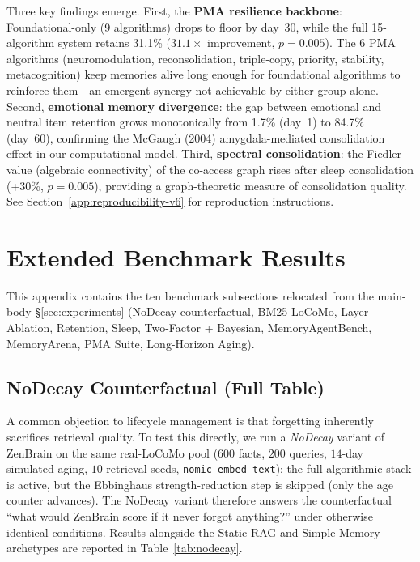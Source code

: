\documentclass{article}
\begin{document}
Three key findings emerge. First, the \textbf{PMA resilience backbone}:
Foundational-only (9 algorithms) drops to floor by day~30, while the
full 15-algorithm system retains 31.1\% ($31.1\times$ improvement,
$p = 0.005$). The 6 PMA algorithms (neuromodulation, reconsolidation,
triple-copy, priority, stability, metacognition) keep memories alive
long enough for foundational algorithms to reinforce them---an emergent
synergy not achievable by either group alone.
Second, \textbf{emotional memory divergence}: the gap between emotional
and neutral item retention grows monotonically from 1.7\% (day~1) to
84.7\% (day~60), confirming the McGaugh (2004) amygdala-mediated
consolidation effect in our computational model.
Third, \textbf{spectral consolidation}: the Fiedler value (algebraic
connectivity) of the co-access graph rises after sleep consolidation
(+30\%, $p = 0.005$), providing a graph-theoretic measure of
consolidation quality.
See Section~\ref{app:reproducibility-v6} for reproduction instructions.

\section{Extended Benchmark Results}
\label{app:extended-benchmarks}

This appendix contains the ten benchmark subsections relocated from
the main-body \S\ref{sec:experiments} (NoDecay counterfactual,
BM25 LoCoMo, Layer Ablation, Retention, Sleep, Two-Factor + Bayesian,
MemoryAgentBench, MemoryArena, PMA Suite, Long-Horizon Aging).

\subsection{NoDecay Counterfactual (Full Table)}
\label{app:nodecay}

A common objection to lifecycle management is that forgetting inherently
sacrifices retrieval quality.  To test this directly, we run a
\emph{NoDecay} variant of ZenBrain on the same real-LoCoMo pool
($600$ facts, $200$ queries, $14$-day simulated aging, $10$ retrieval seeds,
\texttt{nomic-embed-text}): the full algorithmic stack is active, but the
Ebbinghaus strength-reduction step is skipped (only the age counter
advances).  The NoDecay variant therefore answers the counterfactual
``what would ZenBrain score if it never forgot anything?'' under otherwise
identical conditions.  Results alongside the Static RAG and Simple Memory
archetypes are reported in Table~\ref{tab:nodecay}.
\end{document}
